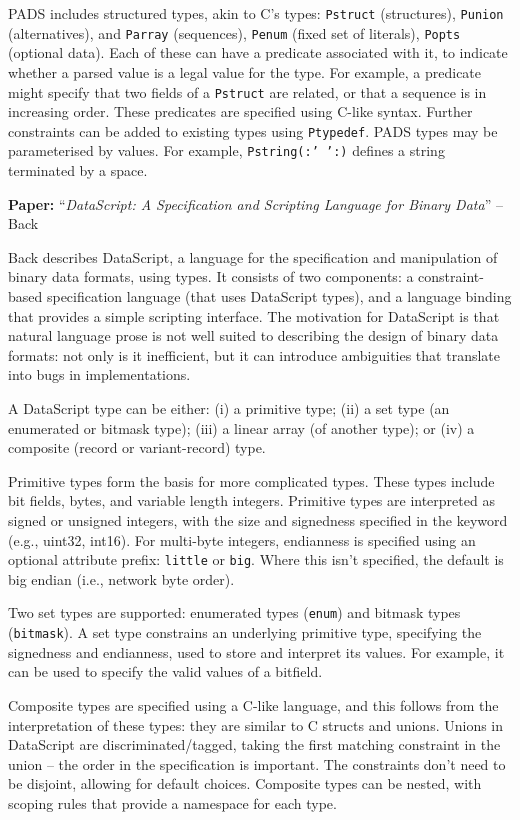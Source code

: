 \documentclass[10pt]{article}
\newcommand{\paper}[3]{\vspace{4mm}\noindent\textbf{Paper:} ``\textit{#1}'' -- #2 \cite{#3}\vspace{3mm}}
\begin{document}
PADS includes structured types, akin to C's types: \texttt{Pstruct} (structures),
\texttt{Punion} (alternatives), and \texttt{Parray} (sequences), \texttt{Penum} (fixed set
of literals), \texttt{Popts} (optional data). Each of these can have a predicate
associated with it, to indicate whether a parsed value is a legal value for the type. For
example, a predicate might specify that two fields of a \texttt{Pstruct} are related, or
that a sequence is in increasing order. These predicates are specified using C-like
syntax. Further constraints can be added to existing types using \texttt{Ptypedef}. PADS
types may be parameterised by values. For example, \texttt{Pstring(:' ':)} defines a
string terminated by a space. 

\paper{DataScript: A Specification and Scripting Language for Binary Data}{Back}{back2002datascript}

Back describes DataScript, a language for the specification and manipulation of binary
data formats, using types. It consists of two components: a constraint-based specification
language (that uses DataScript types), and a language binding that provides a simple
scripting interface. The motivation for DataScript is that natural language prose is not
well suited to describing the design of binary data formats: not only is it inefficient,
but it can introduce ambiguities that translate into bugs in implementations. 

A DataScript type can be either: (i) a primitive type; (ii) a set type (an enumerated
or bitmask type); (iii) a linear array (of another type); or (iv) a composite (record or
variant-record) type.

Primitive types form the basis for more complicated types. These types include bit fields,
bytes, and variable length integers. Primitive types are interpreted as signed or unsigned
integers, with the size and signedness specified in the keyword (e.g., uint32, int16). For 
multi-byte integers, endianness is specified using an optional attribute prefix:
\texttt{little} or \texttt{big}. Where this isn't specified, the default is big endian 
(i.e., network byte order).

Two set types are supported: enumerated types (\texttt{enum}) and bitmask types
(\texttt{bitmask}). A set type constrains an underlying primitive type, specifying the
signedness and endianness, used to store and interpret its values. For example, it can be
used to specify the valid values of a bitfield.

Composite types are specified using a C-like language, and this follows from the
interpretation of these types: they are similar to C structs and unions. Unions in
DataScript are discriminated/tagged, taking the first matching constraint in the union --
the order in the specification is important. The constraints don't need to be disjoint,
allowing for default choices. Composite types can be nested, with scoping rules that
provide a namespace for each type.
\end{document}
